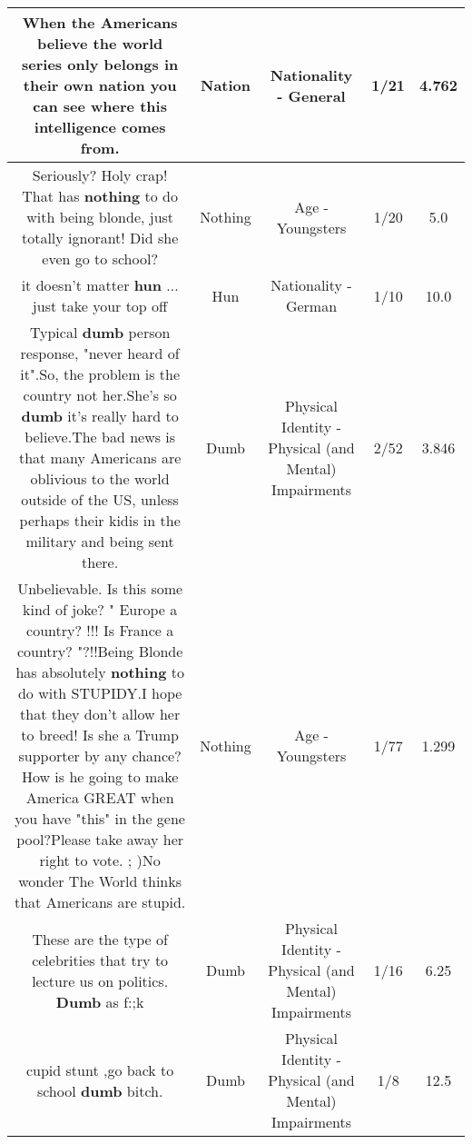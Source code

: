 \documentclass[11pt]{article}
\newlength\mylength
\begin{document}
\begin{center}
\begin{longtable}{|C{.65\mylength}|C{.30\mylength}|C{.12\mylength}|C{.12\mylength}|C{.12\mylength}|}
  \small When the Americans believe the world series only belongs in their own \textbf{nation} you can see where this intelligence comes from.\normalsize   & Nation & Nationality - General & 1/21 & 4.762 \\  \hline
  \small Seriously?  Holy crap!  That has \textbf{nothing} to do with being blonde, just totally ignorant!  Did she even go to school?\normalsize   & Nothing & Age - Youngsters & 1/20 & 5.0 \\  \hline
  \small it doesn't matter \textbf{hun} ... just take your top off\normalsize   & Hun & Nationality - German & 1/10 & 10.0 \\  \hline
  \small Typical \textbf{dumb} person response, "never heard of it".So, the problem is the country not her.She's so \textbf{dumb} it's really hard to believe.The bad news is that many Americans are oblivious to the world outside of the US, unless perhaps their kidis in the military and being sent there.\normalsize   & Dumb & Physical Identity - Physical (and Mental) Impairments & 2/52 & 3.846 \\  \hline
  \small Unbelievable.  Is this some kind of joke?  " Europe a country? !!! Is France a country?  "?!!Being Blonde has absolutely \textbf{nothing} to do with STUPIDY.I hope that they don't allow her to breed! Is she a Trump supporter by any chance?  How is he going to make America GREAT  when you have "this" in the gene pool?Please take away her right to vote.  ; )No wonder The World thinks that Americans are stupid.\normalsize   & Nothing & Age - Youngsters & 1/77 & 1.299 \\  \hline
  \small These are the type of celebrities that try to lecture us on politics. \textbf{Dumb} as f:;k\normalsize   & Dumb & Physical Identity - Physical (and Mental) Impairments & 1/16 & 6.25 \\  \hline
  \small cupid stunt ,go back to school \textbf{dumb} bitch.\normalsize   & Dumb & Physical Identity - Physical (and Mental) Impairments & 1/8 & 12.5 \\  \hline

\end{longtable}
\end{center}
\end{document}
